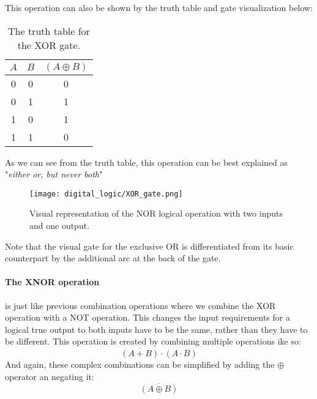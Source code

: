    This operation can also be shown by the truth table and gate visualization below:
    \begin{table}[h!]
        \begin{tabular}{c c | c}
            \toprule
            $A$ & $B$ & $(A \oplus B)$  \\
            \midrule
             0  &  0  &    0    \\
             0  &  1  &    1    \\
             1  &  0  &    1    \\
             1  &  1  &    0    \\
            \bottomrule
        \end{tabular}
        \caption[XOR Gate Truth Table]{The truth table for the XOR gate.}
    \end{table}

    As we can see from the truth table, this operation can be best explained as "\textit{either or, but never both}"

    \begin{figure}[h!]
        \texttt{[image: digital\_logic/XOR\_gate.png]}
        \caption[NOR Gate]{Visual representation of the NOR logical operation with two inputs and one output.}
    \end{figure}

    Note that the visual gate for the exclusive OR is differentiated from its basic counterpart by the additional arc at the back of the gate.

    \paragraph*{The XNOR operation} is just like previous combination operations where we combine the XOR operation with a NOT operation.
    This changes the input requirements for a logical true output to both inputs have to be the same, rather than they have to be different.
    This operation is created by combining multiple operations ike so:
    \begin{equation*}
        \overline{(A+B)} \cdot (A \cdot B)
    \end{equation*}
    And again, these complex combinations can be simplified by adding the $\oplus$ operator an negating it:
    \begin{equation*}
        \overline{(A \oplus B)}
    \end{equation*}

